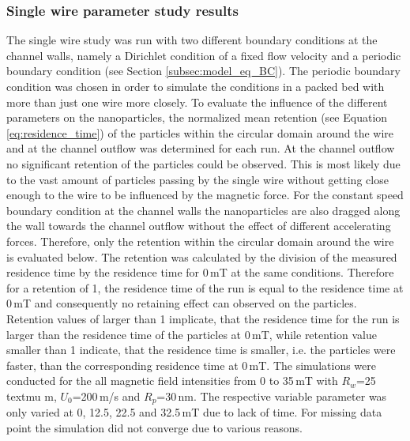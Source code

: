 

\subsubsection{Single wire parameter study results}
\label{subsubsec:One_wire}

The single wire study was run with two different boundary conditions at the channel walls, namely a Dirichlet condition of a fixed flow velocity and a periodic boundary condition (see Section \ref{subsec:model_eq_BC}). The periodic boundary condition was chosen in order to simulate the conditions in a packed bed with more than just one wire more closely. To evaluate the influence of the different parameters on the nanoparticles, the normalized mean retention (see Equation\,\ref{eq:residence_time}) of the particles within the circular domain around the wire and at the channel outflow  was determined for each run. At the channel outflow no significant retention of the particles could be observed. This is most likely due to the vast amount of particles passing by the single wire without getting close enough to the wire to be influenced by the magnetic force. For the constant speed boundary condition at the channel walls the nanoparticles are also dragged along the wall towards the channel outflow without the effect of different accelerating forces. Therefore, only the retention within the circular domain around the wire is evaluated below. The retention was calculated by the division of the measured residence time by the residence time for 0\,mT at the same conditions. Therefore for a retention of 1, the residence time of the run is equal to the residence time at 0\,mT and consequently no retaining effect can observed on the particles. Retention values of larger than 1 implicate, that the residence time for the run is larger than the residence time of the particles at 0\,mT, while retention value smaller than 1 indicate, that the residence time is smaller, i.e. the particles were faster, than the corresponding residence time at 0\,mT. The simulations were conducted for the all magnetic field intensities from 0 to 35\,mT with $R_{w}$=25\,textmu m, $U_{0}$=200\,\textmu m/s and $R_{p}$=30\,nm. The respective variable parameter was only varied at 0, 12.5, 22.5 and 32.5\,mT due to lack of time. For missing data point the simulation did not converge due to various reasons.

